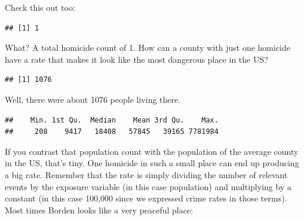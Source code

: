 \documentclass[
]{book}
\makeatletter
\newenvironment{Shaded}{\begin{snugshade}}{\end{snugshade}}
\newcommand{\FunctionTok}[1]{\textcolor[rgb]{0,0,0}{#1}}
\newcommand{\NormalTok}[1]{#1}
\newcommand{\SpecialCharTok}[1]{\textcolor[rgb]{0,0,0}{#1}}
\newenvironment{kframe}{%
\medskip{}
\setlength{\fboxsep}{.8em}
 \def\at@end@of@kframe{}%
 \ifinner\ifhmode%
  \def\at@end@of@kframe{\end{minipage}}%
  \begin{minipage}{\columnwidth}%
 \fi\fi%
 \def\FrameCommand##1{\hskip\@totalleftmargin \hskip-\fboxsep
 \colorbox{shadecolor}{##1}\hskip-\fboxsep
     \hskip-\linewidth \hskip-\@totalleftmargin \hskip\columnwidth}%
 \MakeFramed {\advance\hsize-\width
   \@totalleftmargin\z@ \linewidth\hsize
   \@setminipage}}%
 {\par\unskip\endMakeFramed%
 \at@end@of@kframe}
\renewenvironment{Shaded}{\begin{kframe}}{\end{kframe}}
\makeatother
\begin{document}
Check this out too:

\begin{Shaded}
\end{Shaded}

\begin{verbatim}
## [1] 1
\end{verbatim}

What? A total homicide count of 1. How can a county with just one homicide have a rate that makes it look like the most dangerous place in the US?

\begin{Shaded}
\end{Shaded}

\begin{verbatim}
## [1] 1076
\end{verbatim}

Well, there were about 1076 people living there.

\begin{Shaded}
\end{Shaded}

\begin{verbatim}
##    Min. 1st Qu.  Median    Mean 3rd Qu.    Max. 
##     208    9417   18408   57845   39165 7781984
\end{verbatim}

If you contrast that population count with the population of the average county in the US, that's tiny. One homicide in such a small place can end up producing a big rate. Remember that the rate is simply dividing the number of relevant events by the exposure variable (in this case population) and multiplying by a constant (in this case 100,000 since we expressed crime rates in those terms). Most times Borden looks like a very peaceful place:

\begin{Shaded}
\end{Shaded}
\end{document}
